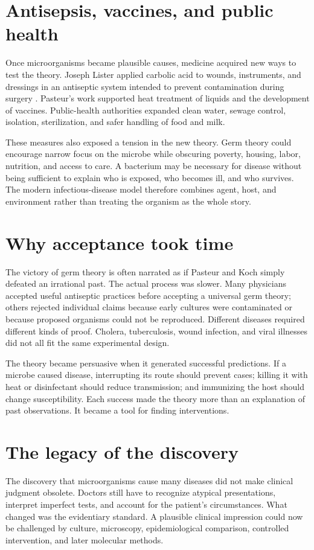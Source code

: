 \documentclass[12pt,oneside]{book}
\begin{document}
\section{Antisepsis, vaccines, and public health}
Once microorganisms became plausible causes, medicine acquired new ways to test
the theory. Joseph Lister applied carbolic acid to wounds, instruments, and
dressings in an antiseptic system intended to prevent contamination during
surgery \cite{lister1867}. Pasteur's work supported heat treatment of liquids
and the development of vaccines. Public-health authorities expanded clean water,
sewage control, isolation, sterilization, and safer handling of food and milk.

These measures also exposed a tension in the new theory. Germ theory could
encourage narrow focus on the microbe while obscuring poverty, housing, labor,
nutrition, and access to care. A bacterium may be necessary for disease without
being sufficient to explain who is exposed, who becomes ill, and who survives.
The modern infectious-disease model therefore combines agent, host, and
environment rather than treating the organism as the whole story.

\section{Why acceptance took time}
The victory of germ theory is often narrated as if Pasteur and Koch simply
defeated an irrational past. The actual process was slower. Many physicians
accepted useful antiseptic practices before accepting a universal germ theory;
others rejected individual claims because early cultures were contaminated or
because proposed organisms could not be reproduced. Different diseases required
different kinds of proof. Cholera, tuberculosis, wound infection, and viral
illnesses did not all fit the same experimental design.

The theory became persuasive when it generated successful predictions. If a
microbe caused disease, interrupting its route should prevent cases; killing it
with heat or disinfectant should reduce transmission; and immunizing the host
should change susceptibility. Each success made the theory more than an
explanation of past observations. It became a tool for finding interventions.

\section{The legacy of the discovery}
The discovery that microorganisms cause many diseases did not make clinical
judgment obsolete. Doctors still have to recognize atypical presentations,
interpret imperfect tests, and account for the patient's circumstances. What
changed was the evidentiary standard. A plausible clinical impression could now
be challenged by culture, microscopy, epidemiological comparison, controlled
intervention, and later molecular methods.
\end{document}
